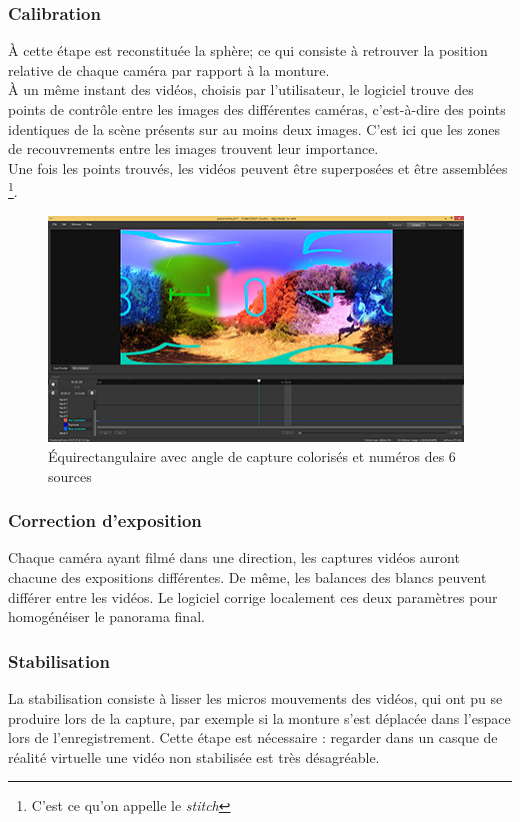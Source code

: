 \subsubsection{Calibration}
À cette étape est reconstituée la sphère; ce qui consiste à retrouver la 
position relative de chaque caméra par rapport à la monture.\\
À un même instant des vidéos, choisis par l'utilisateur, le logiciel trouve des
points de contrôle entre les images des différentes caméras, c'est-à-dire des
points identiques de la scène présents sur au moins deux images. C'est ici que les 
zones de recouvrements entre les images trouvent leur importance.\\
Une fois les points trouvés, les vidéos peuvent être superposées et être assemblées
\footnote{C'est ce qu'on appelle le \textit{stitch}}.
\begin{figure}
  \centering
  \includegraphics[width=11cm]{images/studio-output-angles-numeros.jpg}
  \caption{Équirectangulaire avec angle de capture colorisés et numéros des 6 sources} 
\end{figure}

\subsubsection{Correction d'exposition}
Chaque caméra ayant filmé dans une direction, les captures vidéos auront chacune 
des expositions différentes. De même, les balances des blancs peuvent différer
entre les vidéos. Le logiciel corrige localement ces deux paramètres pour homogénéiser
le panorama final.

\subsubsection{Stabilisation}
La stabilisation consiste à lisser les micros mouvements des vidéos, qui ont 
pu se produire lors de la capture, par exemple si la monture s'est déplacée dans l'espace lors
de l'enregistrement. Cette étape est nécessaire : regarder dans un casque de réalité
virtuelle une vidéo non stabilisée est très désagréable.

